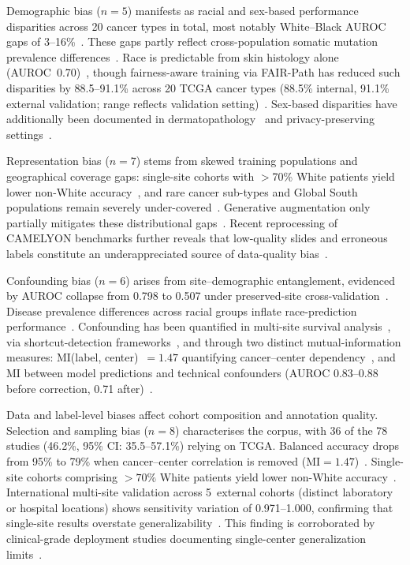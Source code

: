 Demographic bias ($n\!=\!5$) manifests as racial and sex-based performance disparities across 20 cancer types in total, most notably White--Black AUROC gaps of 3--16\%~\citep{vaidya2024demographic}. These gaps partly reflect cross-population somatic mutation prevalence differences~\citep{polin2025mutation}. Race is predictable from skin histology alone (AUROC~0.70)~\citep{chen2025predicting}, though fairness-aware training via FAIR-Path has reduced such disparities by 88.5--91.1\% across 20 TCGA cancer types (88.5\% internal, 91.1\% external validation; range reflects validation setting)~\citep{lin2025contrastive}. Sex-based disparities have additionally been documented in dermatopathology~\citep{lazarova2025demographic, daneshjou2022disparities, marinbenevic2024understanding} and privacy-preserving settings~\citep{arasteh2024preserving}.

Representation bias ($n\!=\!7$) stems from skewed training populations and geographical coverage gaps: single-site cohorts with $>$70\% White patients yield lower non-White accuracy~\citep{soltan2024challenges}, and rare cancer sub-types and Global South populations remain severely under-covered~\citep{tasci2022bias, musa2026cross, ceccon2025underrepresentation}. Generative augmentation only partially mitigates these distributional gaps~\citep{ktena2024generative, vanbooven2025mitigating}. Recent reprocessing of CAMELYON benchmarks further reveals that low-quality slides and erroneous labels constitute an underappreciated source of data-quality bias~\citep{ling2025benchmark}.

Confounding bias ($n\!=\!6$) arises from site--demographic entanglement, evidenced by AUROC collapse from 0.798 to 0.507 under preserved-site cross-validation~\citep{howard2021site}. Disease prevalence differences across racial groups inflate race-prediction performance~\citep{chen2025predicting}. Confounding has been quantified in multi-site survival analysis~\citep{dawood2026confounding}, via shortcut-detection frameworks~\citep{ly2024shortcut}, and through two distinct mutual-information measures: MI(label, center)~$=1.47$ quantifying cancer--center dependency~\citep{kheiri2025investigation}, and MI between model predictions and technical confounders (AUROC 0.83--0.88 before correction, 0.71 after)~\citep{lazard2022identifies}.

Data and label-level biases affect cohort composition and annotation quality. Selection and sampling bias ($n\!=\!8$) characterises the corpus, with 36 of the 78 studies (46.2\%, 95\% CI: 35.5--57.1\%) relying on TCGA. Balanced accuracy drops from 95\% to 79\% when cancer--center correlation is removed (MI$=1.47$)~\citep{kheiri2025investigation}. Single-site cohorts comprising ${>}70\%$ White patients yield lower non-White accuracy~\citep{soltan2024challenges, celi2022sources}. International multi-site validation across 5~external cohorts (distinct laboratory or hospital locations) shows sensitivity variation of 0.971--1.000, confirming that single-site results overstate generalizability~\citep{tolkach2023international}. This finding is corroborated by clinical-grade deployment studies documenting single-center generalization limits~\citep{raza2026clinical, bussola2023weakly, ceccon2025underrepresentation}.

